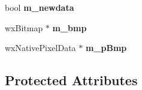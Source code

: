 \begin{DoxyCompactItemize}
\item 
\hypertarget{class_plot_panel_a803a71153ab9758b6134fc51855a71b3}{bool {\bfseries m\-\_\-newdata}}\label{class_plot_panel_a803a71153ab9758b6134fc51855a71b3}

\item 
\hypertarget{class_plot_panel_a8cf01c846dc561a79c0d1dee88a80ef4}{wx\-Bitmap $\ast$ {\bfseries m\-\_\-bmp}}\label{class_plot_panel_a8cf01c846dc561a79c0d1dee88a80ef4}

\item 
\hypertarget{class_plot_panel_a274a9ad1bf4f03ccc74ae259029835d5}{wx\-Native\-Pixel\-Data $\ast$ {\bfseries m\-\_\-p\-Bmp}}\label{class_plot_panel_a274a9ad1bf4f03ccc74ae259029835d5}

\end{DoxyCompactItemize}
\subsection*{Protected Attributes}
